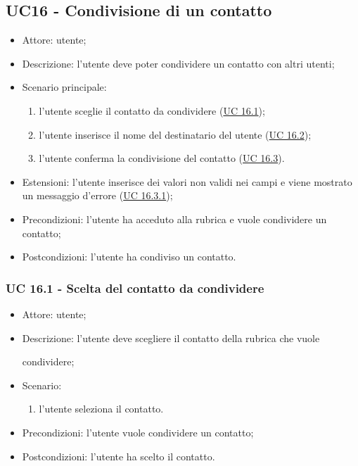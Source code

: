 \subsection{UC16 - Condivisione di un contatto}
\begin{itemize}
    \item Attore: utente;
    \item Descrizione: l'utente deve poter condividere un contatto con altri utenti;
    \item Scenario principale:
        \begin{enumerate}
        \item l'utente sceglie il contatto da condividere (\hyperref[sec: UC 16.1]{UC 16.1});
        \item l'utente inserisce il nome del destinatario del utente (\hyperref[sec: UC 16.2]{UC 16.2});
        \item l'utente conferma la condivisione del contatto (\hyperref[sec: UC 16.3]{UC 16.3}).
        \end{enumerate}
    \item Estensioni: l'utente inserisce dei valori non validi nei campi e viene mostrato un messaggio d'errore (\hyperref[sec: UC 16.3.1]{UC 16.3.1});
    \item Precondizioni: l'utente ha acceduto alla rubrica e vuole condividere un contatto;
    \item Postcondizioni: l'utente ha condiviso un contatto.
\end{itemize}

\subsubsection{UC 16.1 - Scelta del contatto da condividere} \label{sec: UC 16.1}
\begin{itemize}
    \item Attore: utente;
    \item Descrizione: l'utente deve scegliere il contatto della rubrica che vuole \par condividere;
    \item Scenario:
        \begin{enumerate}
        \item l'utente seleziona il contatto.
        \end{enumerate}
    
    \item Precondizioni: l'utente vuole condividere un contatto;
    \item Postcondizioni: l'utente ha scelto il contatto.
\end{itemize}


